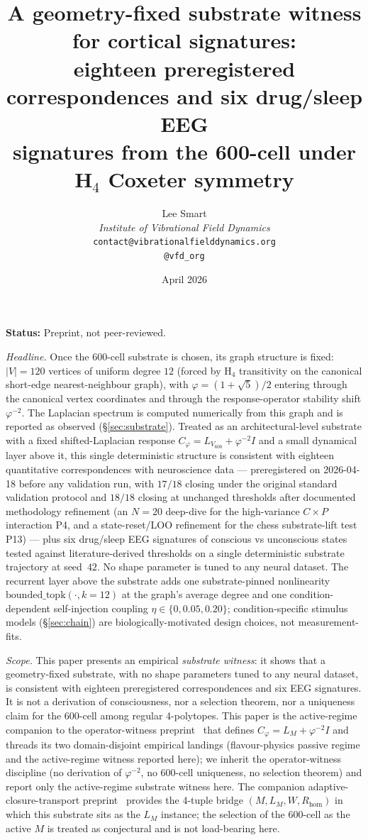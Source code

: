 \documentclass[11pt]{article}
\title{A geometry-fixed substrate witness for cortical signatures:\\
       eighteen preregistered correspondences and six drug/sleep EEG\\
       signatures from the 600-cell under H$_4$ Coxeter symmetry}
\author{%
  Lee Smart\\[2pt]
  \textit{Institute of Vibrational Field Dynamics}\\[2pt]
  \texttt{contact@vibrationalfielddynamics.org}\\[2pt]
  \texttt{@vfd\_org}%
}
\date{April 2026}
\newcommand{\Ph}{\varphi}
\newcommand{\Lop}{L_{V_{600}}}
\newcommand{\Cph}{C_{\Ph}}
\begin{document}
\maketitle

\noindent\textbf{Status:} Preprint, not peer-reviewed.

\noindent\emph{Headline.}
Once the 600-cell substrate is chosen, its graph structure is fixed:
$|V|=120$ vertices of uniform degree $12$ (forced by H$_4$ transitivity
on the canonical short-edge nearest-neighbour graph), with
$\Ph=(1+\sqrt{5})/2$ entering through the canonical vertex coordinates
and through the response-operator stability shift $\Ph^{-2}$. The
Laplacian spectrum is computed numerically from this graph and is
reported as observed (\S\ref{sec:substrate}). Treated
as an architectural-level substrate with a fixed shifted-Laplacian
response $\Cph = \Lop + \Ph^{-2} I$ and a small dynamical layer above
it, this single deterministic structure is consistent with eighteen
quantitative correspondences with neuroscience data — preregistered
on 2026-04-18 before any validation run, with $17/18$ closing under
the original standard validation protocol and $18/18$ closing at
unchanged thresholds after documented methodology refinement (an
$N\!=\!20$ deep-dive for the high-variance $C\!\times\!P$
interaction P4, and a state-reset/LOO refinement for the chess
substrate-lift test P13) — plus six drug/sleep EEG signatures of
conscious vs unconscious states tested against
literature-derived thresholds on a single deterministic substrate
trajectory at seed~$42$. No shape parameter is tuned to any neural
dataset. The recurrent layer above the substrate adds one
substrate-pinned nonlinearity $\mathrm{bounded\_topk}(\cdot, k\!=\!12)$
at the graph's average degree and one condition-dependent self-injection
coupling $\eta\!\in\!\{0, 0.05, 0.20\}$; condition-specific stimulus
models (\S\ref{sec:chain}) are biologically-motivated design choices,
not measurement-fits.

\noindent\emph{Scope.}
This paper presents an empirical \emph{substrate witness}: it shows
that a geometry-fixed substrate, with no shape parameters tuned to any
neural dataset, is consistent with eighteen preregistered correspondences
and six EEG signatures. It is not a derivation of consciousness, nor a
selection theorem, nor a uniqueness claim for the 600-cell among regular
4-polytopes. This paper is the active-regime companion to the
operator-witness preprint~\citep{SmartAriaClosureKernel2026} that
defines $\Cph = L_M + \Ph^{-2} I$ and threads its two domain-disjoint
empirical landings (flavour-physics passive regime and the
active-regime witness reported here); we inherit the operator-witness
discipline (no derivation of $\Ph^{-2}$, no 600-cell uniqueness, no
selection theorem) and report only the active-regime substrate witness
here. The companion adaptive-closure-transport
preprint~\citep{SmartAdaptiveClosureTransport2026} provides the
4-tuple bridge $(M, L_M, W, R_{\mathrm{hom}})$ in which this substrate
sits as the $L_M$ instance; the selection of the 600-cell as the active
$M$ is treated as conjectural and is not load-bearing here.
\end{document}
